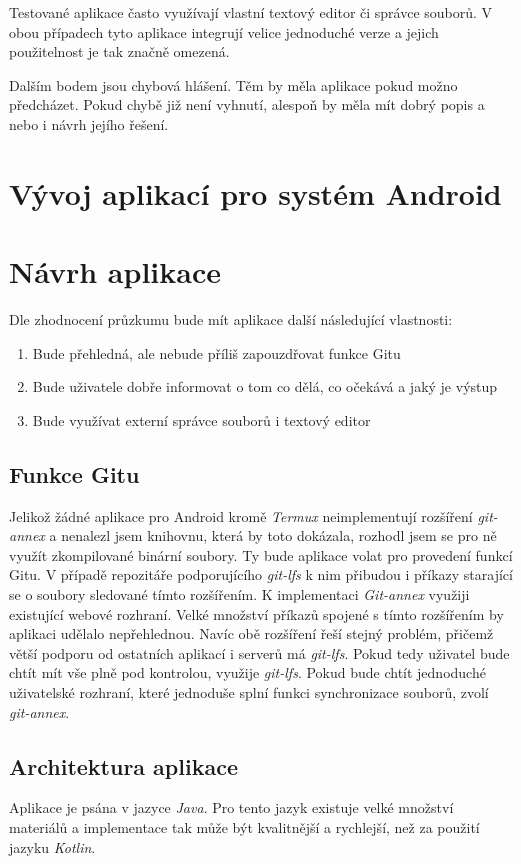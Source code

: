     Testované aplikace často využívají vlastní textový editor či správce souborů. V obou případech tyto aplikace integrují velice jednoduché verze a jejich použitelnost je tak značně omezená.

    Dalším bodem jsou chybová hlášení. Těm by měla aplikace pokud možno předcházet. Pokud chybě již není vyhnutí, alespoň by měla mít dobrý popis a nebo i návrh jejího řešení.

\chapter{Vývoj aplikací pro systém Android}
\chapter{Návrh aplikace}
    Dle zhodnocení průzkumu bude mít aplikace další následující vlastnosti:
    \begin{enumerate}
        \item Bude přehledná, ale nebude příliš zapouzdřovat funkce Gitu
        \item Bude uživatele dobře informovat o tom co dělá, co očekává a jaký je výstup
        \item Bude využívat externí správce souborů i textový editor
    \end{enumerate}

    \section{Funkce Gitu}
    Jelikož žádné aplikace pro Android kromě \emph{Termux} neimplementují rozšíření \emph{git-annex} a nenalezl jsem knihovnu, která by toto dokázala, rozhodl jsem se pro ně využít zkompilované binární soubory. Ty bude aplikace volat pro provedení funkcí Gitu.
    V případě repozitáře podporujícího \emph{git-lfs} k nim přibudou i příkazy starající se o soubory sledované tímto rozšířením. K implementaci \emph{Git-annex} využiji existující webové rozhraní. Velké množství příkazů spojené s tímto rozšířením by aplikaci udělalo nepřehlednou. Navíc obě rozšíření řeší stejný problém, přičemž větší podporu od ostatních aplikací i serverů má \emph{git-lfs}. Pokud tedy uživatel bude chtít mít vše plně pod kontrolou, využije \emph{git-lfs}. Pokud bude chtít jednoduché uživatelské rozhraní, které jednoduše splní funkci synchronizace souborů, zvolí \emph{git-annex}.

    \section{Architektura aplikace}
    Aplikace je psána v jazyce \emph{Java}. Pro tento jazyk existuje velké množství materiálů a implementace tak může být kvalitnější a rychlejší, než za použití jazyku \emph{Kotlin}.

